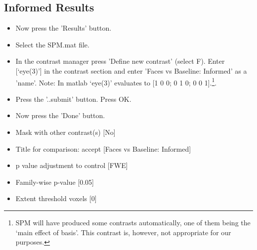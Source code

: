 \documentclass[a4paper,titlepage]{book}
\newcommand{\bi}{\begin{itemize}}
\newcommand{\ei}{\end{itemize}}
\begin{document}
\subsection{Informed Results}

\bi
\item{Now press the 'Results' button.}
\item{Select the SPM.mat file.}
\item{In the contrast manager press 'Define new contrast' (select F). Enter [`eye(3)'] in the contrast section and enter 'Faces vs Baseline: Informed' as a 'name'. Note: In matlab `eye(3)' evaluates to [1 0 0; 0 1 0; 0 0 1].\footnote{SPM will have produced some contrasts automatically, one of them being the `main effect of basis'. This contrast is, however, not 
appropriate for our purposes.}.}
\item{Press the '..submit' button. Press OK.}
\item{Now press the 'Done' button.}
\item{Mask with other contrast(s) [No]}
\item{Title for comparison: accept [Faces vs Baseline: Informed]}
\item{p value adjustment to control [FWE]}
\item{Family-wise p-value [0.05]}
\item{Extent threshold {voxels} [0]}
\ei
\end{document}
